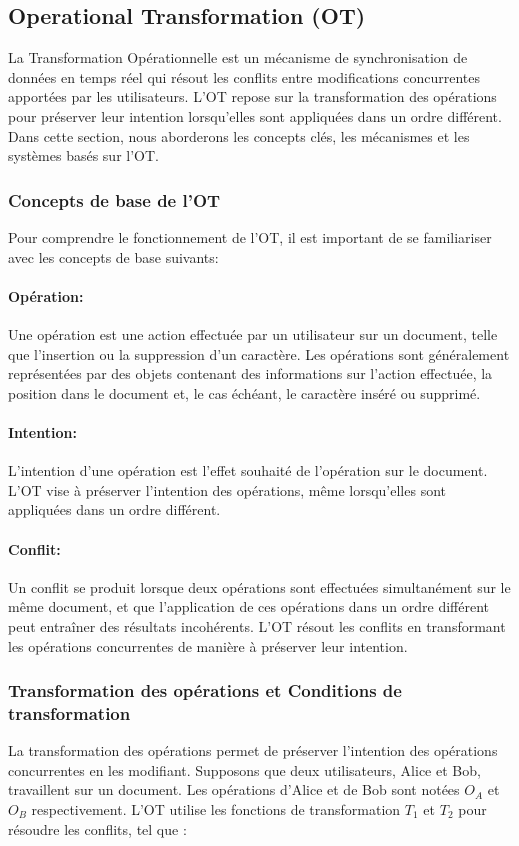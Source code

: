 \subsection{Operational Transformation (OT)}
La Transformation Opérationnelle est un mécanisme de synchronisation de données en temps réel qui résout les conflits entre modifications concurrentes apportées par les utilisateurs. L'OT repose sur la transformation des opérations pour préserver leur intention lorsqu'elles sont appliquées dans un ordre différent. Dans cette section, nous aborderons les concepts clés, les mécanismes et les systèmes basés sur l'OT.

\subsubsection{Concepts de base de l'OT}
Pour comprendre le fonctionnement de l'OT, il est important de se familiariser avec les concepts de base suivants:

\paragraph{Opération:} Une opération est une action effectuée par un utilisateur sur un document, telle que l'insertion ou la suppression d'un caractère. Les opérations sont généralement représentées par des objets contenant des informations sur l'action effectuée, la position dans le document et, le cas échéant, le caractère inséré ou supprimé.
\paragraph{Intention:} L'intention d'une opération est l'effet souhaité de l'opération sur le document. L'OT vise à préserver l'intention des opérations, même lorsqu'elles sont appliquées dans un ordre différent.
\paragraph{Conflit:} Un conflit se produit lorsque deux opérations sont effectuées simultanément sur le même document, et que l'application de ces opérations dans un ordre différent peut entraîner des résultats incohérents. L'OT résout les conflits en transformant les opérations concurrentes de manière à préserver leur intention.

\subsubsection{Transformation des opérations et Conditions de transformation}
La transformation des opérations permet de préserver l'intention des opérations concurrentes en les modifiant. Supposons que deux utilisateurs, Alice et Bob, travaillent sur un document. Les opérations d'Alice et de Bob sont notées $O_A$ et $O_B$ respectivement. L'OT utilise les fonctions de transformation $T_1$ et $T_2$ pour résoudre les conflits, tel que :

